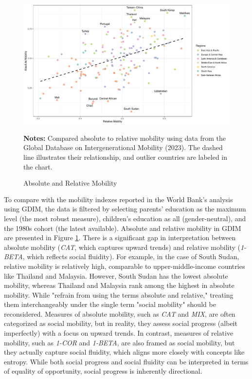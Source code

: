 \begin{figure}[h!]
    \centering
	\includegraphics[width=\textwidth]{figs/abs_rel.pdf}
    \caption{Absolute and Relative Mobility}
    \label{fig:abs_rel}
   \begin{minipage}{1\linewidth}
 	\vspace{0.2cm}
 	\footnotesize
 	\textbf{Notes:} Compared absolute to relative mobility using data from the Global Database on Intergenerational Mobility (2023). The dashed line illustrates their relationship, and outlier countries are labeled in the chart.
 \end{minipage}
\end{figure}

To compare with the mobility indexes reported in the World Bank's analysis using GDIM, the data is filtered by selecting parents' education as the maximum level (the most robust measure), children's education as all (gender-neutral), and the 1980s cohort (the latest available). Absolute and relative mobility in GDIM are presented in Figure \ref{fig:abs_rel}. There is a significant gap in interpretation between absolute mobility (\textit{CAT}, which captures upward trends) and relative mobility (\textit{1-BETA}, which reflects social fluidity). For example, in the case of South Sudan, relative mobility is relatively high, comparable to upper-middle-income countries like Thailand and Malaysia. However, South Sudan has the lowest absolute mobility, whereas Thailand and Malaysia rank among the highest in absolute mobility. While \citet{van2024intergenerational} "refrain from using the terms absolute and relative," treating them interchangeably under the single term "social mobility" should be reconsidered. Measures of absolute mobility, such as \textit{CAT} and \textit{MIX}, are often categorized as social mobility, but in reality, they assess social progress (albeit imperfectly) with a focus on upward trends. In contrast, measures of relative mobility, such as \textit{1-COR} and \textit{1-BETA}, are also framed as social mobility, but they actually capture social fluidity, which aligns more closely with concepts like entropy. While both social progress and social fluidity can be interpreted in terms of equality of opportunity, social progress is inherently directional.

